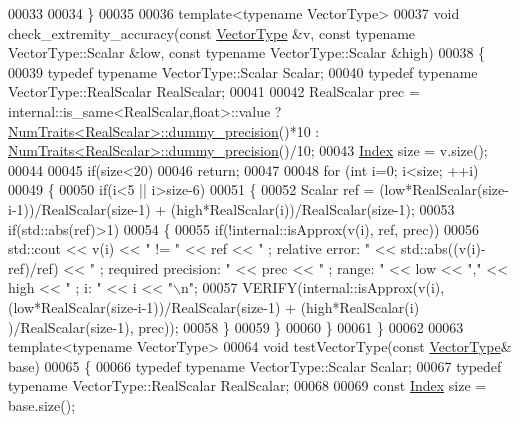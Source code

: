 \begin{DoxyCode}
00033 
00034 \}
00035 
00036 \textcolor{keyword}{template}<\textcolor{keyword}{typename} VectorType>
00037 \textcolor{keywordtype}{void} check\_extremity\_accuracy(\textcolor{keyword}{const} \hyperlink{struct_vector_type}{VectorType} &v, \textcolor{keyword}{const} \textcolor{keyword}{typename} VectorType::Scalar &low, \textcolor{keyword}{const} \textcolor{keyword}{
      typename} VectorType::Scalar &high)
00038 \{
00039   \textcolor{keyword}{typedef} \textcolor{keyword}{typename} VectorType::Scalar Scalar;
00040   \textcolor{keyword}{typedef} \textcolor{keyword}{typename} VectorType::RealScalar RealScalar;
00041 
00042   RealScalar prec = internal::is\_same<RealScalar,float>::value ? 
      \hyperlink{group___core___module_struct_eigen_1_1_num_traits}{NumTraits<RealScalar>::dummy\_precision}()*10 : 
      \hyperlink{group___core___module_struct_eigen_1_1_num_traits}{NumTraits<RealScalar>::dummy\_precision}()/10;
00043   \hyperlink{namespace_eigen_a62e77e0933482dafde8fe197d9a2cfde}{Index} size = v.size();
00044 
00045   \textcolor{keywordflow}{if}(size<20)
00046     \textcolor{keywordflow}{return};
00047 
00048   \textcolor{keywordflow}{for} (\textcolor{keywordtype}{int} i=0; i<size; ++i)
00049   \{
00050     \textcolor{keywordflow}{if}(i<5 || i>size-6)
00051     \{
00052       Scalar ref = (low*RealScalar(size-i-1))/RealScalar(size-1) + (high*RealScalar(i))/RealScalar(size-1);
00053       \textcolor{keywordflow}{if}(std::abs(ref)>1)
00054       \{
00055         \textcolor{keywordflow}{if}(!internal::isApprox(v(i), ref, prec))
00056           std::cout << v(i) << \textcolor{stringliteral}{" != "} << ref << \textcolor{stringliteral}{"  ; relative error: "} << std::abs((v(i)-ref)/ref) << \textcolor{stringliteral}{"  ;
       required precision: "} << prec << \textcolor{stringliteral}{"  ; range: "} << low << \textcolor{stringliteral}{","} << high << \textcolor{stringliteral}{"  ; i: "} << i << \textcolor{stringliteral}{"\(\backslash\)n"};
00057         VERIFY(internal::isApprox(v(i), (low*RealScalar(size-i-1))/RealScalar(size-1) + (high*RealScalar(i)
      )/RealScalar(size-1), prec));
00058       \}
00059     \}
00060   \}
00061 \}
00062 
00063 \textcolor{keyword}{template}<\textcolor{keyword}{typename} VectorType>
00064 \textcolor{keywordtype}{void} testVectorType(\textcolor{keyword}{const} \hyperlink{struct_vector_type}{VectorType}& base)
00065 \{
00066   \textcolor{keyword}{typedef} \textcolor{keyword}{typename} VectorType::Scalar Scalar;
00067   \textcolor{keyword}{typedef} \textcolor{keyword}{typename} VectorType::RealScalar RealScalar;
00068 
00069   \textcolor{keyword}{const} \hyperlink{namespace_eigen_a62e77e0933482dafde8fe197d9a2cfde}{Index} size = base.size();

\end{DoxyCode}
